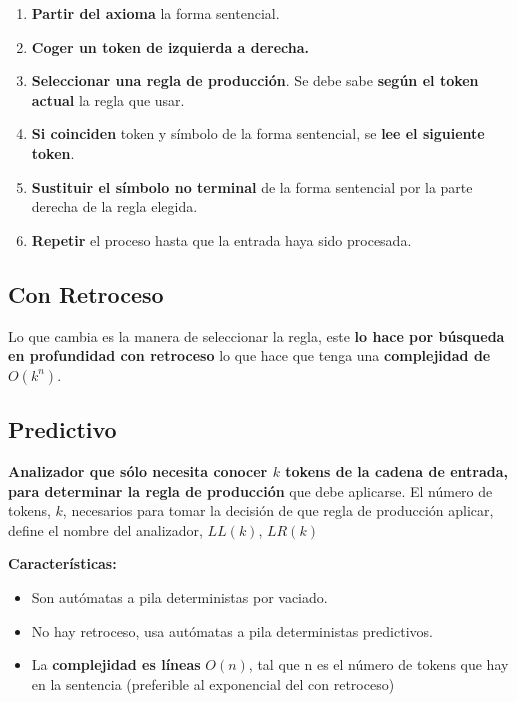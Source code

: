 \documentclass[12pt]{report} %
\begin{document}
\begin{enumerate}
\def\labelenumi{\arabic{enumi}.}

\item
  \textbf{Partir del axioma} la forma sentencial.
\item
  \textbf{Coger un token de izquierda a derecha.}
\item
  \textbf{Seleccionar una regla de producción}. Se debe sabe
  \textbf{según el token actual} la regla que usar.
\item
  \textbf{Si coinciden} token y símbolo de la forma sentencial, se
  \textbf{lee el siguiente token}.
\item
  \textbf{Sustituir el símbolo no terminal} de la forma sentencial por
  la parte derecha de la regla elegida.
\item
  \textbf{Repetir} el proceso hasta que la entrada haya sido procesada.
\end{enumerate}


\subsection{Con Retroceso}

Lo que cambia es la manera de seleccionar la regla, este \textbf{lo hace
por búsqueda en profundidad con retroceso} lo que hace que tenga una
\textbf{complejidad de \(O(k^n)\)}.


\subsection{Predictivo}

\textbf{Analizador que sólo necesita conocer \(k\) tokens de la cadena
de entrada, para determinar la regla de producción} que debe aplicarse.
El número de tokens, \(k\), necesarios para tomar la decisión de que
regla de producción aplicar, define el nombre del analizador, \(LL(k)\),
\(LR(k)\)

\textbf{Características:}

\begin{itemize}

\item
  Son autómatas a pila deterministas por vaciado.
\item
  No hay retroceso, usa autómatas a pila deterministas predictivos.
\item
  La \textbf{complejidad es líneas} \(O(n)\), tal que n es el número de
  tokens que hay en la sentencia (preferible al exponencial del con
  retroceso)
\end{itemize}
\end{document}
